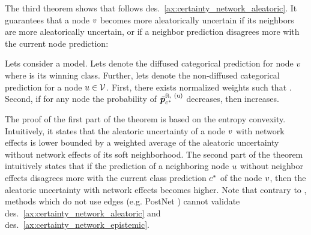 The third theorem shows that \GPNacro{} follows des.~\ref{ax:certainty_network_aleatoric}. It guarantees that a node $v$ becomes more aleatorically uncertain if its neighbors are more aleatorically uncertain, or if a neighbor prediction disagrees more with the current node prediction:
\begin{theorem}
\label{thm:axiom-network-aleatoric}
Lets consider a \GPNacro{} model. Lets denote  the diffused categorical prediction for node $v$ where \smash{$\iclass^*$} is its winning class. Further, lets denote  the non-diffused categorical prediction for a node $\nodeu \in \vertices$. First, there exists normalized weights  such that . Second, if for any node \smash{$\nodeu \in \vertices$} the probability of $\bar{\bm{p}}_{c^*}^\text{ft, (u)}$ decreases, then  increases.
\end{theorem}
The proof of the first part of the theorem is based on the entropy convexity. Intuitively, it states that the aleatoric uncertainty  of a node $v$ with network effects is lower bounded by a weighted average of the aleatoric uncertainty without network effects of its soft neighborhood. The second part of the theorem intuitively states that if the prediction of a neighboring node $u$ without neighbor effects disagrees more with the current class prediction $\iclass^*$ of the node $v$, then the aleatoric uncertainty  with network effects becomes higher. Note that contrary to \GPNacro{}, methods which do not use edges (e.g. PostNet \cite{charpentier2020}) cannot validate des.~\ref{ax:certainty_network_aleatoric} and des.~\ref{ax:certainty_network_epistemic}.
